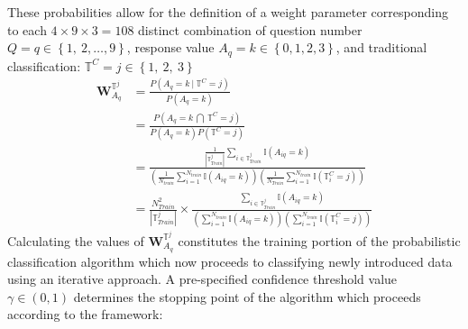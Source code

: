 \documentclass[12pt,]{article}
\begin{document}
These probabilities allow for the definition of a weight parameter
corresponding to each \(4\times9\times3 =108\) distinct combination of
question number \(Q=q \in \left \{ 1, \ 2, \ldots, 9 \right \}\),
response value \(A_{q} = k \in \left \{ 0, 1, 2, 3 \right \}\), and
traditional classification:
\(\mathbb{T}^{C} = j \in \left \{ 1, \ 2 , \ 3 \right \}\)
\begin{align*}
  \mathbf{W}_{A_{q}}^{\mathbb{T}^j} &= \frac{P\left(A_{q} = k \ \Big | \ \mathbb{T}^{C}=j \right) }{P\left( A_{q} = k   \right) } \tag{EQ: 1.3.2-1} \label{EQ: 1.3.2-1} \\[0.5em]
&= \frac{P\left(A_{q} = k \ \bigcap \ \mathbb{T}^{C}=j \right)}{P\left( A_{q} = k   \right)P\left( \mathbb{T}^{C}=j  \right)}\\[0.5em]
&= \frac{\frac{1}{|\mathbb{T}_{Train}^{j}|} \sum_{i \in \mathbb{T}_{Train}^{j}} \mathbb{I} \left(A_{iq}=k \right)}{\left( \frac{1}{N_{train}} \sum_{i=1}^{N_{train}} \mathbb{I}\left(A_{iq}=k \right) \right) \left( \frac{1}{N_{Train}} \sum_{i=1}^{N_{train}} \mathbb{I}\left(\mathbb{T}_{i}^{C}=j \right) \right) }\\[0.5em]
&= \frac{N_{Train}^{2}}{|\mathbb{T}_{Train}^{j}|} \times \frac{\sum_{i \in \mathbb{T}_{Train}^{j}} \mathbb{I} \left(A_{iq}=k \right)}{\left( \sum_{i=1}^{N_{train}} \mathbb{I}\left(A_{iq}=k \right)  \right)  \left(  \sum_{i=1}^{N_{train}} \mathbb{I}\left(\mathbb{T}_{i}^{C}=j \right)  \right) }   
\end{align*} Calculating the values of
\(\mathbf{W}_{A_{q}}^{\mathbb{T}^{j}}\) constitutes the training portion
of the probabilistic classification algorithm which now proceeds to
classifying newly introduced data using an iterative approach. A
pre-specified confidence threshold value \(\gamma \in (0,1)\) determines
the stopping point of the algorithm which proceeds according to the
framework:
\end{document}
